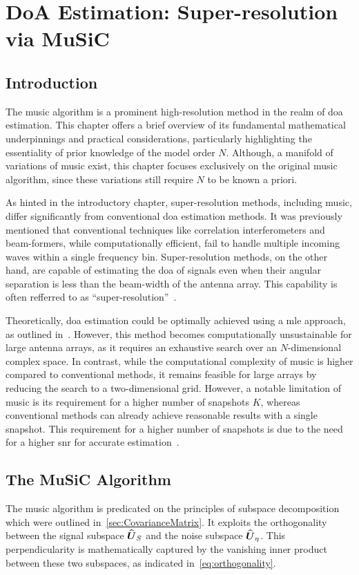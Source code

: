\chapter{DoA Estimation: Super-resolution via MuSiC}
\label{ch:OverviewMUSIC}

\section{Introduction}
The \gls{music} algorithm is a prominent high-resolution method in the realm of \gls{doa} estimation.
This chapter offers a brief overview of its fundamental mathematical underpinnings and practical considerations,
particularly highlighting the essentiality of prior knowledge of the model order \( N \). Although, a manifold of
variations of \gls{music} exist, this chapter focuses exclusively on the original \gls{music} algorithm, since these
variations still require \( N \) to be known a priori.

As hinted in the introductory chapter, super-resolution methods, including \gls{music}, differ significantly from
conventional \gls{doa} estimation methods. It was previously mentioned that conventional techniques like correlation
interferometers and beam-formers, while computationally efficient, fail to handle multiple incoming waves within a single
frequency bin. Super-resolution methods, on the other hand, are capable of estimating the \gls{doa} of signals even when
their angular separation is less than the beam-width of the antenna array. This capability is often refferred to as
``super-resolution''~\cite{tuncer.ch1}.

Theoretically, \gls{doa} estimation could be optimally achieved using a \glsdesc{mle} approach, as outlined
in~\cite{tuncer.ch1}. However, this method becomes computationally unsustainable for large antenna arrays, as it requires
an exhaustive search over an \( N \)-dimensional complex space.
In contrast, while the computational complexity of \gls{music} is higher compared to conventional methods, it remains
feasible for large arrays by reducing the search to a two-dimensional grid.
However, a notable limitation of \gls{music} is its requirement for a
higher number of snapshots \( K \), whereas conventional methods can already achieve reasonable results with a single
snapshot. This requirement for a higher number of snapshots is due to the need for a higher
\gls{snr} for accurate estimation~\cite{tuncer.ch1}.

\section{The MuSiC Algorithm}
\label{sec:music_algorithm}
The \gls{music} algorithm is predicated on the principles of subspace decomposition which were outlined in~\autoref{sec:CovarianceMatrix}.
It exploits the orthogonality between the signal subspace \( \widehat{\boldsymbol{U}}_S \) and the noise subspace \( \widehat{\boldsymbol{U}}_\eta \).
This perpendicularity is mathematically captured by the vanishing inner product between these two subspaces, as indicated
in~\autoref{eq:orthogonality}.

